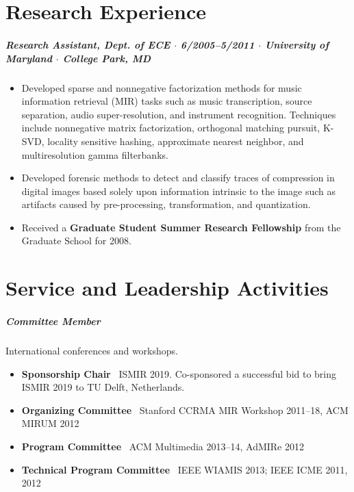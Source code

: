\documentclass[10pt,letterpaper]{article}
\begin{document}
\section*{Research Experience}

\subparagraph{Research Assistant, Dept. of ECE  $\cdot$ \textnormal{6/2005--5/2011} $\cdot$ University of Maryland  $\cdot$ \textnormal{College Park, MD}}
\begin{itemize}
    \item Developed sparse and nonnegative factorization methods for music information retrieval (MIR) tasks such as music transcription, source separation, audio super-resolution, and instrument recognition. Techniques include nonnegative matrix factorization, orthogonal matching pursuit, K-SVD, locality sensitive hashing, approximate nearest neighbor, and multiresolution gamma filterbanks.
    \item Developed forensic methods to detect and classify traces of compression in digital images based solely upon information intrinsic to the image such as artifacts caused by pre-processing, transformation, and quantization.
    \item Received a \textbf{Graduate Student Summer Research Fellowship} from the Graduate School for 2008.
\end{itemize}







\section*{Service and Leadership Activities}

\subparagraph{Committee Member} International conferences and workshops.
\begin{itemize}
    \item \textbf{Sponsorship Chair} \ ISMIR 2019. Co-sponsored a successful bid to bring ISMIR 2019 to TU Delft, Netherlands.
    \item \textbf{Organizing Committee} \ Stanford CCRMA MIR Workshop 2011--18, ACM MIRUM 2012
    \item \textbf{Program Committee} \ ACM Multimedia 2013--14, AdMIRe 2012
    \item \textbf{Technical Program Committee} \ IEEE WIAMIS 2013; IEEE ICME 2011, 2012
\end{itemize}
\end{document}
